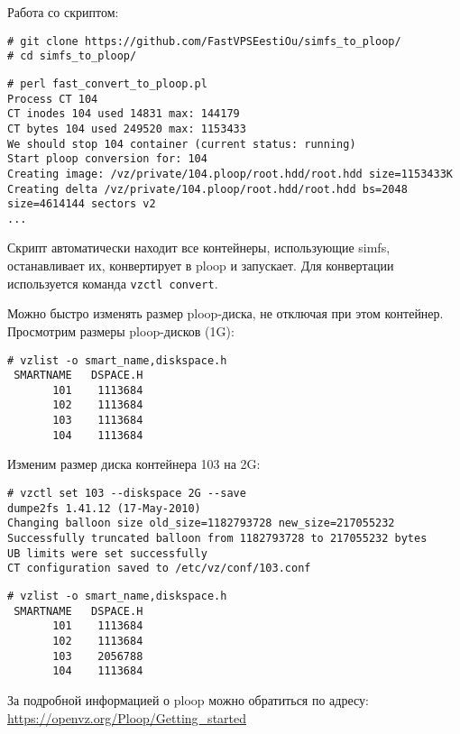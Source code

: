 Работа со скриптом:
\begin{lstlisting}
# git clone https://github.com/FastVPSEestiOu/simfs_to_ploop/
# cd simfs_to_ploop/
\end{lstlisting}

\begin{lstlisting}
# perl fast_convert_to_ploop.pl
Process CT 104
CT inodes 104 used 14831 max: 144179
CT bytes 104 used 249520 max: 1153433
We should stop 104 container (current status: running)
Start ploop conversion for: 104
Creating image: /vz/private/104.ploop/root.hdd/root.hdd size=1153433K
Creating delta /vz/private/104.ploop/root.hdd/root.hdd bs=2048 size=4614144 sectors v2
...
\end{lstlisting}

Скрипт автоматически находит все контейнеры, использующие simfs, останавливает их, конвертирует в ploop и запускает.
Для конвертации используется команда \texttt{vzctl convert}.
\fi

Можно быстро изменять размер ploop-диска, не отключая при этом контейнер.
Просмотрим размеры ploop-дисков (1G):
\begin{lstlisting}
# vzlist -o smart_name,diskspace.h
 SMARTNAME   DSPACE.H
       101    1113684
       102    1113684
       103    1113684
       104    1113684
\end{lstlisting} 

Изменим размер диска контейнера 103 на 2G:
\begin{lstlisting}
# vzctl set 103 --diskspace 2G --save
dumpe2fs 1.41.12 (17-May-2010)
Changing balloon size old_size=1182793728 new_size=217055232
Successfully truncated balloon from 1182793728 to 217055232 bytes
UB limits were set successfully
CT configuration saved to /etc/vz/conf/103.conf
\end{lstlisting}
\begin{lstlisting}
# vzlist -o smart_name,diskspace.h
 SMARTNAME   DSPACE.H
       101    1113684
       102    1113684
       103    2056788
       104    1113684
\end{lstlisting} 

За подробной информацией о ploop можно обратиться по адресу: \url{https://openvz.org/Ploop/Getting_started}

\clearpage

